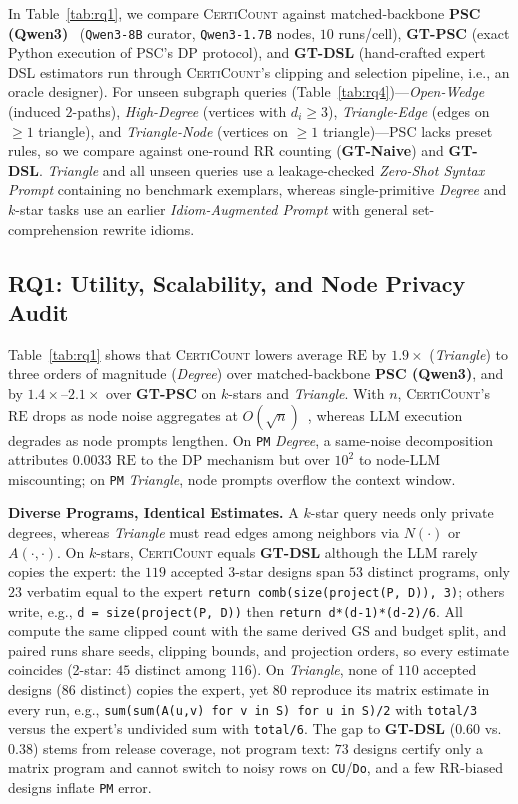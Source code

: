 \documentclass[conference]{IEEEtran}
\newlength{\ieeeindent}
\newcommand{\parhead}[1]{\par\noindent\hspace*{\ieeeindent}\textbf{#1}}
\theoremstyle{ieeeitalic}
\newcommand{\GS}{\mathrm{GS}}
\newcommand{\RE}{\mathrm{RE}}
\begin{document}
In Table~\ref{tab:rq1}, we compare \textsc{CertiCount} against matched-backbone \textbf{PSC (Qwen3)}~\cite{zhang2026psc} (\texttt{Qwen3-8B} curator, \texttt{Qwen3-1.7B} nodes, $10$ runs/cell), \textbf{GT-PSC} (exact Python execution of PSC's DP protocol), and \textbf{GT-DSL} (hand-crafted expert DSL estimators run through \textsc{CertiCount}'s clipping and selection pipeline, i.e., an oracle designer). For unseen subgraph queries (Table~\ref{tab:rq4})---\emph{Open-Wedge} (induced $2$-paths), \emph{High-Degree} (vertices with $d_i \ge 3$), \emph{Triangle-Edge} (edges on $\ge 1$ triangle), and \emph{Triangle-Node} (vertices on $\ge 1$ triangle)---PSC lacks preset rules, so we compare against one-round RR counting (\textbf{GT-Naive}) and \textbf{GT-DSL}. \emph{Triangle} and all unseen queries use a leakage-checked \emph{Zero-Shot Syntax Prompt} containing no benchmark exemplars, whereas single-primitive \emph{Degree} and $k$-star tasks use an earlier \emph{Idiom-Augmented Prompt} with general set-comprehension rewrite idioms.

\subsection{RQ1: Utility, Scalability, and Node Privacy Audit}
\label{sec:rq1}

Table~\ref{tab:rq1} shows that \textsc{CertiCount} lowers average $\RE$ by $1.9\times$ (\emph{Triangle}) to three orders of magnitude (\emph{Degree}) over matched-backbone \textbf{PSC (Qwen3)}, and by $1.4\times$--$2.1\times$ over \textbf{GT-PSC} on $k$-stars and \emph{Triangle}. With $n$, \textsc{CertiCount}'s $\RE$ drops as node noise aggregates at $O(\sqrt{n})$~\cite{imola2021locally}, whereas LLM execution degrades as node prompts lengthen. On \texttt{PM} \emph{Degree}, a same-noise decomposition attributes $0.0033$ $\RE$ to the DP mechanism but over $10^2$ to node-LLM miscounting; on \texttt{PM} \emph{Triangle}, node prompts overflow the context window.

\parhead{Diverse Programs, Identical Estimates.}
A $k$-star query needs only private degrees, whereas \emph{Triangle} must read edges among neighbors via $N(\cdot)$ or $A(\cdot,\cdot)$. On $k$-stars, \textsc{CertiCount} equals \textbf{GT-DSL} although the LLM rarely copies the expert: the $119$ accepted 3-star designs span $53$ distinct programs, only $23$ verbatim equal to the expert \texttt{return comb(size(project(P, D)), 3)}; others write, e.g., \texttt{d = size(project(P, D))} then \texttt{return d*(d-1)*(d-2)/6}. All compute the same clipped count with the same derived $\GS$ and budget split, and paired runs share seeds, clipping bounds, and projection orders, so every estimate coincides (2-star: $45$ distinct among $116$). On \emph{Triangle}, none of $110$ accepted designs ($86$ distinct) copies the expert, yet $80$ reproduce its matrix estimate in every run, e.g., \texttt{sum(sum(A(u,v) for v in S) for u in S)/2} with \texttt{total/3} versus the expert's undivided sum with \texttt{total/6}. The gap to \textbf{GT-DSL} ($0.60$ vs.\ $0.38$) stems from release coverage, not program text: $73$ designs certify only a matrix program and cannot switch to noisy rows on \texttt{CU}/\texttt{Do}, and a few RR-biased designs inflate \texttt{PM} error.
\end{document}
